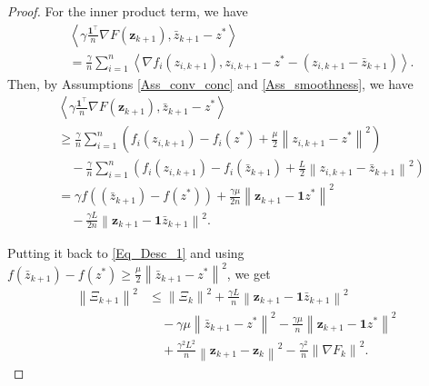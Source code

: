 \documentclass[letterpaper, 10 pt, conference]{ieeeconf}
\begin{document}
\begin{proof}
For the inner product term, we have
\begin{equation*}
\begin{aligned}
&\left< \gamma \frac{\mathbf{1}^{\top}}{n}\nabla F\left( \mathbf{z}_{k+1} \right) ,\bar{z}_{k+1}-z^* \right> 
\\
&=\frac{\gamma}{n}\sum_{i=1}^n{\left< \nabla f_i\left( z_{i,k+1} \right) ,z_{i,k+1}-z^*-\left( z_{i,k+1}-\bar{z}_{k+1} \right) \right>}.
\end{aligned}
\end{equation*}
Then, by Assumptions \ref{Ass_conv_conc} and \ref{Ass_smoothness}, we have
\begin{equation*}
\begin{aligned}
&\left< \gamma \frac{\mathbf{1}^{\top}}{n}\nabla F\left( \mathbf{z}_{k+1} \right) ,\bar{z}_{k+1}-z^* \right> 
\\
&\geqslant \frac{\gamma}{n}\sum_{i=1}^n{\left( f_i\left( z_{i,k+1} \right) -f_i\left( z^* \right) +\frac{\mu}{2}\left\| z_{i,k+1}-z^* \right\| ^2 \right)}
\\
&\quad-\frac{\gamma}{n}\sum_{i=1}^n{\left( f_i\left( z_{i,k+1} \right) -f_i\left( \bar{z}_{k+1} \right) +\frac{L}{2}\left\| z_{i,k+1}-\bar{z}_{k+1} \right\| ^2 \right)}
\\
&=\gamma f\left( \left( \bar{z}_{k+1} \right) -f\left( z^* \right) \right) +\frac{\gamma \mu}{2n}\left\| \mathbf{z}_{k+1}-\mathbf{1}z^* \right\| ^2
\\
&\quad-\frac{\gamma L}{2n}\left\| \mathbf{z}_{k+1}-\mathbf{1}\bar{z}_{k+1} \right\| ^2.
\end{aligned}
\end{equation*}

Putting it back to \eqref{Eq_Desc_1} and using $f\left( \bar{z}_{k+1} \right) -f\left( z^* \right) \geqslant \frac{\mu}{2}\left\| \bar{z}_{k+1}-z^* \right\| ^2$, we get
\begin{equation*}
\begin{aligned}
\left\| \varXi _{k+1} \right\| ^2
&\leqslant \left\| \varXi _k \right\| ^2+\frac{\gamma L}{n}\left\| \mathbf{z}_{k+1}-\mathbf{1}\bar{z}_{k+1} \right\| ^2
\\
&\quad-\gamma \mu \left\| \bar{z}_{k+1}-z^* \right\| ^2-\frac{\gamma \mu}{n}\left\| \mathbf{z}_{k+1}-\mathbf{1}z^* \right\| ^2
\\
&\quad+\frac{\gamma ^2L^2}{n}\left\| \mathbf{z}_{k+1}-\mathbf{z}_k \right\| ^2-\frac{\gamma ^2}{n}\left\| \nabla F_k \right\| ^2.
\end{aligned}
\end{equation*}


\end{proof}
\end{document}
